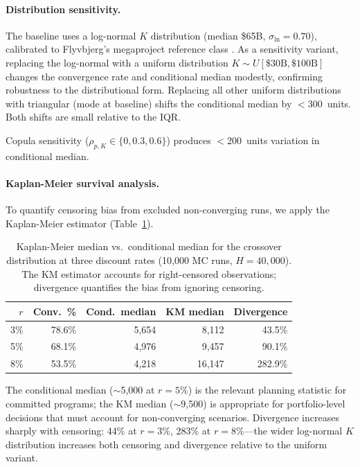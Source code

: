 \documentclass[preprint,12pt]{elsarticle}
\begin{document}
\paragraph{Distribution sensitivity.} The baseline uses a log-normal $K$ distribution (median \$65B, $\sigma_{\ln} = 0.70$), calibrated to Flyvbjerg's megaproject reference class \cite{flyvbjerg2014}. As a sensitivity variant, replacing the log-normal with a uniform distribution $K \sim U[\$30\text{B}, \$100\text{B}]$ changes the convergence rate and conditional median modestly, confirming robustness to the distributional form. Replacing all other uniform distributions with triangular (mode at baseline) shifts the conditional median by $<$300~units. Both shifts are small relative to the IQR.

Copula sensitivity ($\rho_{p,K} \in \{0, 0.3, 0.6\}$) produces $<$200~units variation in conditional median.

\paragraph{Kaplan-Meier survival analysis.} To quantify censoring bias from excluded non-converging runs, we apply the Kaplan-Meier estimator \cite{kaplan1958} (Table~\ref{tab:kaplan_meier}).

\begin{table}[htbp]
\centering
\caption{Kaplan-Meier median vs.\ conditional median for the crossover distribution at three discount rates (10{,}000 MC runs, $H = 40{,}000$). The KM estimator accounts for right-censored observations; divergence quantifies the bias from ignoring censoring.}
\label{tab:kaplan_meier}
\small
\begin{tabular}{@{}rrrrr@{}}
\toprule
$r$ & Conv.\ \% & Cond.\ median & KM median & Divergence \\
\midrule
3\%  & 78.6\% & 5{,}654 & 8{,}112  & 43.5\% \\
5\%  & 68.1\% & 4{,}976 & 9{,}457  & 90.1\% \\
8\%  & 53.5\% & 4{,}218 & 16{,}147 & 282.9\% \\
\bottomrule
\end{tabular}
\end{table}

The conditional median ($\sim$5{,}000 at $r = 5\%$) is the relevant planning statistic for committed programs; the KM median ($\sim$9{,}500) is appropriate for portfolio-level decisions that must account for non-converging scenarios. Divergence increases sharply with censoring: 44\% at $r = 3\%$, 283\% at $r = 8\%$---the wider log-normal $K$ distribution increases both censoring and divergence relative to the uniform variant.
\end{document}
